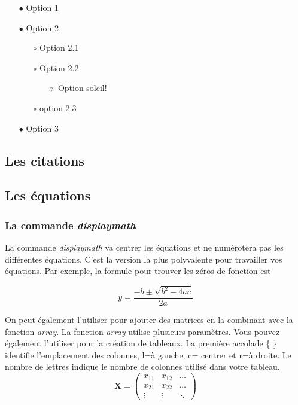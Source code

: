 \documentclass[12pt,twoside,a4paper]{article}
\begin{document}
	\begin{itemize} %
		\item[$\bullet$] Option 1 %
		\item[$\bullet$] Option 2
		\begin{enumerate}
			\item[$\circ$] Option 2.1
			\item[$\circ$] Option 2.2
			\begin{enumerate}
				\item[$\sun$] Option soleil!
			\end{enumerate}
			\item[$\circ$] option 2.3
		\end{enumerate}
		\item[$\bullet$] Option 3
	\end{itemize}
	
	\subsection{Les citations}
	
	\subsection{Les équations}
	
	\subsubsection{La commande \textit{displaymath}}
	La commande \textit{displaymath} va centrer les équations et ne numérotera pas les différentes équations. C'est la version la plus polyvalente pour travailler vos équations. Par exemple, la formule pour trouver les zéros de fonction est 
	
	\begin{displaymath}
		y=\frac{-b\pm\sqrt{b^2-4ac}}{2a}
	\end{displaymath}
	
	\noindent On peut également l'utiliser pour ajouter des matrices en la combinant avec la fonction \textit{array}. %
	La fonction \textit{array} utilise plusieurs paramètres. Vous pouvez également l'utiliser pour la création de tableaux. La première accolade \{ \} identifie l'emplacement des colonnes, l=à gauche, c= centrer et r=à droite. Le nombre de lettres indique le nombre de colonnes utilisé dans votre tableau. 
	\begin{displaymath}
		\mathbf{X} =
		\left( \begin{array}{ccc}
			x_{11} & x_{12} & \ldots \\
			x_{21} & x_{22} & \ldots \\
			\vdots & \vdots & \ddots
		\end{array} \right)
	\end{displaymath}
	
\end{document}
